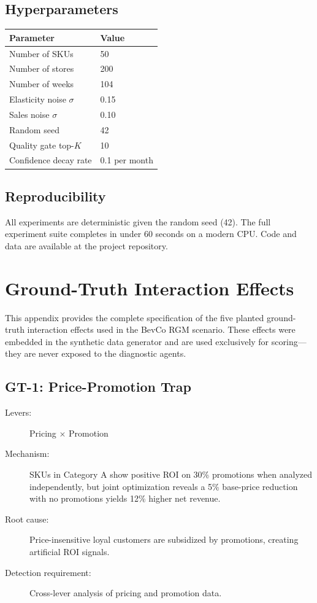 \documentclass[11pt,a4paper]{article}
\begin{document}
\subsection{Hyperparameters}

\begin{tabular}{ll}
\toprule
\textbf{Parameter} & \textbf{Value} \\
\midrule
Number of SKUs & 50 \\
Number of stores & 200 \\
Number of weeks & 104 \\
Elasticity noise $\sigma$ & 0.15 \\
Sales noise $\sigma$ & 0.10 \\
Random seed & 42 \\
Quality gate top-$K$ & 10 \\
Confidence decay rate & 0.1 per month \\
\bottomrule
\end{tabular}

\subsection{Reproducibility}

All experiments are deterministic given the random seed (42).
The full experiment suite completes in under 60 seconds on a modern CPU.
Code and data are available at the project repository.


\section{Ground-Truth Interaction Effects}
\label{app:groundtruth}

This appendix provides the complete specification of the five planted ground-truth interaction effects used in the BevCo RGM scenario.
These effects were embedded in the synthetic data generator and are used exclusively for scoring---they are never exposed to the diagnostic agents.

\subsection{GT-1: Price-Promotion Trap}

\begin{description}
    \item[Levers:] Pricing $\times$ Promotion
    \item[Mechanism:] SKUs in Category A show positive ROI on 30\% promotions when analyzed independently, but joint optimization reveals a 5\% base-price reduction with no promotions yields 12\% higher net revenue.
    \item[Root cause:] Price-insensitive loyal customers are subsidized by promotions, creating artificial ROI signals.
    \item[Detection requirement:] Cross-lever analysis of pricing and promotion data.
\end{description}
\end{document}
